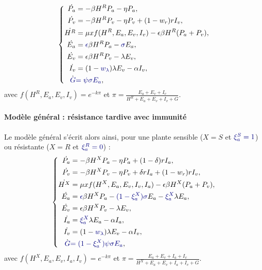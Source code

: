 \begin{equation}
  \left\{
    \begin{aligned}
      \dot{P_a} &=- \beta H^R P_a - \eta P_a,\\
      \dot{P_v} &=- \beta H^R P_v - \eta P_v  + (1-w_{r}) r I_v,\\
      \dot{H^R} &= \mu x f(H^R,E_a,E_v,I_v) - \epsilon \beta H^R (P_a + P_v),\\
      \dot{E_a} &= \textcolor{navyblue}{\epsilon} \beta  H^R P_a - \textcolor{navyblue}{\sigma} E_a,\\
      \dot{E_v} &=  \epsilon \beta H^R P_v - \lambda E_v,\\
      \dot{I_v} &= (1-\textcolor{navyblue}{w_{\lambda}}) \lambda E_v -\alpha I_v,\\
      \dot{\textcolor{navyblue}{G}} & \textcolor{navyblue}{= \psi \sigma E_a},
    \end{aligned}
  \right.
  \label{eq:resistance-tardive}
\end{equation}
avec $f(H^R,E_a,E_v,I_v)= e^{-k \pi}$ et $\pi=\frac{E_a+E_v+I_v}{H^R+E_a+E_v+I_v+G}$.
 
	
\paragraph{Modèle général : résistance tardive avec immunité}

Le modèle général s'écrit alors ainsi, pour une plante sensible ($X=S$ et $\textcolor{navyblue}{\xi^S_a=1}$) ou résistante ($X=R$ et $\textcolor{navyblue}{\xi^R_a=0}$) :
\begin{equation}
  \left\{
    \begin{aligned}
      \dot{P_a} &=- \beta H^X P_a - \eta P_a + (1-\delta) r I_a,\\
      \dot{P_v} &=- \beta H^X P_v - \eta P_v + \delta r I_a + (1-w_{r}) r I_v,\\
      \dot{H^X} &= \mu x f(H^X,E_a,E_v,I_v,I_a) - \epsilon \beta H^X (P_a +  P_v),\\
      \dot{E_a} &= \textcolor{navyblue}{\epsilon} \beta H^X P_a - \textcolor{navyblue}{(1-\xi^X_a) \sigma}  E_a - \textcolor{navyblue}{\xi^X_a} \lambda E_a,\\
      \dot{E_v} &=  \epsilon \beta H^X P_v - \lambda E_v,\\
      \dot{I_a} &= \textcolor{navyblue}{\xi^X_a} \lambda E_a - \alpha I_a ,\\
      \dot{I_v} & = (1-\textcolor{navyblue}{w_{\lambda}}) \lambda E_v - \alpha I_v,\\
      \dot{\textcolor{navyblue}{G}} & \textcolor{navyblue}{= (1- \xi^X_a) \psi \sigma E_a},
    \end{aligned}
  \right.
  \label{RT_im}
\end{equation}
avec $f(H^X,E_a,E_v,I_a,I_v)= e^{-k \pi}$ et $\pi= \frac{E_a+E_v+I_a+I_v}{H^X+E_a+E_v+I_a+I_v+G}$.
	

